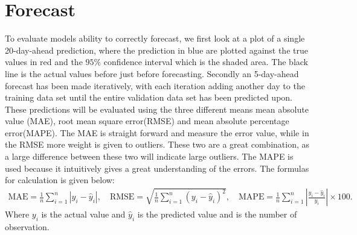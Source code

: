 \section{Forecast}
To evaluate models ability to correctly forecast, we first look at a plot of a single 20-day-ahead prediction, where the prediction in blue are plotted against the true values in red and the $95\%$ confidence interval which is the shaded area. The black line is the actual values before just before forecasting. Secondly an 5-day-ahead forecast has been made iteratively, with each iteration adding another day to the training data set until the entire validation data set has been predicted upon. These predictions will be evaluated using the three different means mean absolute value (MAE), root mean square error(RMSE) and mean absolute percentage error(MAPE). The MAE is straight forward and measure the error value, while in the RMSE more weight is given to outliers. These two are a great combination, as a large difference between these two will indicate large outliers. The MAPE is used because it intuitively gives a great understanding of the errors. The formulas for calculation is given below:
\begin{align*}
    \text{MAE} = \frac{1}{n} \sum_{i=1}^{n} |y_i - \hat{y}_i|, \quad \text{RMSE} = \sqrt{\frac{1}{n} \sum_{i=1}^{n} (y_i - \hat{y}_i)^2}, \quad \text{MAPE} = \frac{1}{n} \sum_{i=1}^{n} \left| \frac{y_i - \hat{y}_i}{y_i} \right| \times 100.
\end{align*}
\noindent Where $y_i$ is the actual value and $\hat{y}_i$ is the predicted value and is the number of observation.

